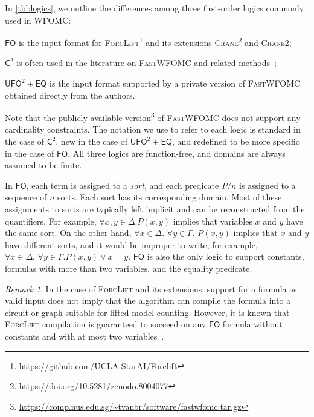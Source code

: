 \documentclass[letterpaper]{article} %
\theoremstyle{remark}
\newtheorem*{remark}{Remark}
\theoremstyle{definition}
\newcommand{\Ctwo}{$\mathsf{C}^{2}$}
\newcommand{\FO}{$\mathsf{FO}$}
\newcommand{\UFO}{$\mathsf{UFO}^{2} + \mathsf{EQ}$}
\newcommand{\Cranetwo}{\textsc{Crane2}}
\begin{document}
In \cref{tbl:logics}, we outline the differences among three first-order logics
commonly used in WFOMC:
\begin{enumerate*}[label=(\roman*)]
  \item \FO{} is the input format for
  \textsc{ForcLift}\footnote{\url{https://github.com/UCLA-StarAI/Forclift}} and
  its extensions
  \textsc{Crane}\footnote{\url{https://doi.org/10.5281/zenodo.8004077}} and
  \Cranetwo{};
  \item \Ctwo{} is often used in the literature on \textsc{FastWFOMC} and
  related
  methods~\cite{DBLP:journals/jair/Kuzelka21,DBLP:conf/aaai/MalhotraS22};
  \item \UFO{} is the input format supported by a private version of
  \textsc{FastWFOMC} obtained directly from the authors.
\end{enumerate*}
Note that the publicly available
version\footnote{\url{https://comp.nus.edu.sg/~tvanbr/software/fastwfomc.tar.gz}}
of \textsc{FastWFOMC} does not support any cardinality constraints. The notation
we use to refer to each logic is standard in the case of \Ctwo{}, new in the
case of \UFO{}, and redefined to be more specific in the case of \FO{}. All
three logics are function-free, and domains are always assumed to be finite.

In \FO{}, each term is assigned to a \emph{sort}, and each predicate $P/n$ is
assigned to a sequence of $n$ sorts. Each sort has its corresponding domain.
Most of these assignments to sorts are typically left implicit and can be
reconstructed from the quantifiers. For example, $\forall x,y \in \Delta\text{.
}P(x, y)$ implies that variables $x$ and $y$ have the same sort. On the other
hand, $\forall x \in \Delta\text{. }\forall y \in \Gamma\text{. } P(x, y)$
implies that $x$ and $y$ have different sorts, and it would be improper to
write, for example, $\forall x \in \Delta\text{. }\forall y \in \Gamma\text{.
} P(x, y) \lor x = y$. \FO{} is also the only logic to support constants,
formulas with more than two variables, and the equality predicate.

\begin{remark}
  In the case of \textsc{ForcLift} and its extensions, support for a formula as
  valid input does not imply that the algorithm can compile the formula into a
  circuit or graph suitable for lifted model counting. However, it is known that
  \textsc{ForcLift} compilation is guaranteed to succeed on any \FO{} formula
  without constants and with at most two
  variables~\cite{DBLP:conf/nips/Broeck11,DBLP:conf/kr/BroeckMD14}.
\end{remark}
\end{document}
